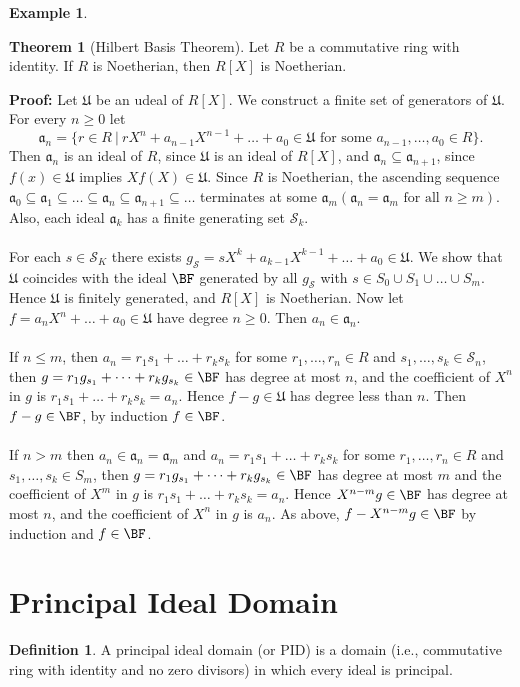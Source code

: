 \documentclass[11pt]{amsbook}%
\theoremstyle{plain}
\theoremstyle{definition}
\newtheorem{definition*}{Definition}
\newtheorem*{example*}{Example}
\newtheorem{theorem}{Theorem}
\numberwithin{equation}{section}
\newcommand{\SC}{\mathcal S}
\newcommand{\af}{\mathfrak a}
\newcommand{\UF}{\mathfrak U}
\renewcommand{\proof}{ \textbf{Proof: }}
\begin{document}
\begin{example*}
\begin{theorem}[Hilbert Basis Theorem]
  Let $R$ be a commutative ring with identity. If $R$ is Noetherian, then $R[X]$ is Noetherian.
\end{theorem} \vspace{1.8em}
\proof Let $\UF$ be an udeal of $R[X]$. We construct a finite set of generators of $\UF$.
For every $n \geq 0$ let
$$
\af_{n} = \{r \in R \ | \ rX^{n} + a_{n-1}X^{n-1} + \dots + a_{0} \in \UF \text{ for some } a_{n-1}, \dots, a_{0} \in R\}.
$$
Then $\af_{n}$ is an ideal of $R$, since $\UF$ is an ideal of $R[X]$, and $\af_{n} \subseteq \af_{n+1}$, since
$f(x) \in \UF$ implies $Xf(X) \in \UF$. Since $R$ is Noetherian, the ascending sequence
$\af_{0} \subseteq \af_{1} \subseteq \dots \subseteq \af_{n} \subseteq \af_{n+1} \subseteq \dots$
terminates at some $\af_{m}(\af_{n} = \af_{m} \text{ for all } n \geq m)$. Also, each
ideal $\af_{k}$ has a finite generating set $\SC_{k}$. \\ \\
For each $s \in \SC_{K}$ there exists $g_{\SC} = sX^{k} + a_{k-1}X^{k-1} + \dots + a_{0} \in \UF$.
We show that $\UF$ coincides with the ideal $\BF$ generated by all $g_{\SC}$ with $s \in S_{0} \cup S_{1} \cup \dots \cup S_{m}$.
Hence $\UF$ is finitely generated, and $R[X]$ is Noetherian. Now let $f = a_{n}X^{n} + \dots + a_{0} \in \UF$
have degree $n \geq 0$. Then $a_{n} \in \af_{n}$. \\ \\
If $n \leq m$, then $a_{n} = r_{1}s_{1} + \dots + r_{k}s_{k}$ for some $r_{1}, \dots, r_{n} \in R$ and
$s_{1}, \dots, s_{k} \in \SC_{n}$, then $g = r_{1}g_{s_{1}} + \dots + r_{k}g_{s_{k}} \in \BF$ has degree at most $n$,
and the coefficient of $X^{n}$ in $g$ is $r_{1}s_{1} + \dots + r_{k}s_{k} = a_{n}$. Hence
$f-g \in \UF$ has degree less than $n$. Then $f-g \in \BF$, by induction $f \in \BF$. \\ \\
If $n > m$ then $a_{n} \in \af_{n} = \af_{m}$ and $a_{n} = r_{1}s_{1} + \dots + r_{k}s_{k}$ for some
$r_{1}, \dots, r_{n} \in R$ and $s_{1}, \dots, s_{k} \in S_{m}$, then $g = r_{1}g_{s_{1}} + \dots + r_{k}g_{s_{k}} \in \BF$
has degree at most $m$ and the coefficient of $X^{m}$ in $g$ is $r_{1}s_{1} + \dots + r_{k}s_{k} = a_{n}$.
Hence $X^{n-m}g \in \BF$ has degree at most $n$, and the coefficient of $X^{n}$ in $g$ is $a_{n}$.
As above, $f - X^{n-m}g \in \BF$ by induction and $f \in \BF$. \qedsymbol


\section{Principal Ideal Domain}
\begin{definition*}
  A principal ideal domain (or PID) is a domain (i.e., commutative ring with identity and no zero divisors)
  in which every ideal is principal.
\end{definition*}


\end{example*}
\end{document}
